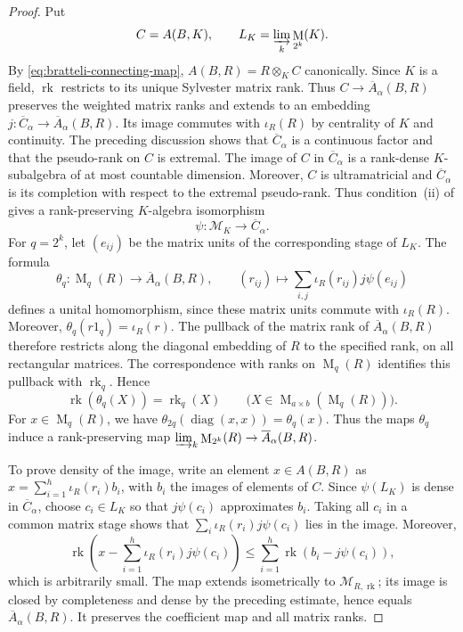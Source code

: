 \documentclass[11pt]{amsart}
\DeclareMathOperator{\rk}{rk}
\DeclareMathOperator{\Mat}{M}
\DeclareMathOperator{\diag}{diag}
\theoremstyle{definition}
\theoremstyle{remark}
\begin{document}
\begin{proof}
Put
\[
 C=A(B,K),\qquad
 L_K=\varinjlim_k\Mat_{2^k}(K).
\]
By \eqref{eq:bratteli-connecting-map},
$A(B,R)=R\otimes_K C$ canonically.
Since $K$ is a field, $\rk$ restricts to its unique Sylvester matrix rank.
Thus $C\to \overline A_\alpha(B,R)$ preserves the weighted matrix ranks and extends to an
embedding $j:\overline C_\alpha\to \overline A_\alpha(B,R)$.
Its image commutes with $\iota_R(R)$ by centrality of $K$ and continuity.
The preceding discussion shows that $\overline C_\alpha$ is a continuous
factor and that the pseudo-rank on $C$ is extremal.
The image of $C$ in $\overline C_\alpha$ is a rank-dense
$K$-subalgebra of at most countable dimension.  Moreover, $C$ is
ultramatricial and $\overline C_\alpha$ is its completion with respect
to the extremal pseudo-rank.  Thus condition~(ii) of
\cite[Theorem~2.2]{AraClaramunt2018} gives a
rank-preserving $K$-algebra isomorphism
\[
 \psi:\mathcal M_K\longrightarrow\overline C_\alpha.
\]
For $q=2^k$, let $(e_{ij})$ be the matrix units of the corresponding
stage of $L_K$.  The formula
\[
 \theta_q:\Mat_q(R)\longrightarrow \overline A_\alpha(B,R),\qquad
 (r_{ij})\longmapsto\sum_{i,j}\iota_R(r_{ij})j\psi(e_{ij})
\]
defines a unital homomorphism, since these matrix units commute with
$\iota_R(R)$.  Moreover, $\theta_q(r1_q)=\iota_R(r)$.
The pullback of the matrix rank of $\overline A_\alpha(B,R)$ therefore restricts along the
diagonal embedding of $R$ to the specified rank, on all rectangular
matrices.  The correspondence with ranks on $\Mat_q(R)$
\cite[Proposition~1.4]{JaikinLopez2020} identifies this pullback with
$\rk_q$.  Hence
\[
 \rk(\theta_q(X))=\rk_q(X)
 \qquad\bigl(X\in\Mat_{a\times b}(\Mat_q(R))\bigr).
\]
For $x\in\Mat_q(R)$, we have
$\theta_{2q}(\diag(x,x))=\theta_q(x)$.
Thus the maps $\theta_q$ induce a rank-preserving map
$\varinjlim_k\Mat_{2^k}(R)\to \overline A_\alpha(B,R)$.

To prove density of the image, write an element $x\in A(B,R)$ as
$x=\sum_{i=1}^h\iota_R(r_i)b_i$, with $b_i$ the images of elements of $C$.
Since $\psi(L_K)$ is dense in $\overline C_\alpha$, choose $c_i\in L_K$
so that $j\psi(c_i)$ approximates $b_i$.  Taking all $c_i$ in a common
matrix stage shows that $\sum_i\iota_R(r_i)j\psi(c_i)$ lies in the image.
Moreover,
\[
 \rk\left(x-\sum_{i=1}^h\iota_R(r_i)j\psi(c_i)\right)
 \leq\sum_{i=1}^h\rk(b_i-j\psi(c_i)),
\]
which is arbitrarily small.  The map extends isometrically to
$\mathcal M_{R,\rk}$; its image is closed by completeness and dense by the
preceding estimate, hence equals $\overline A_\alpha(B,R)$.  It preserves the coefficient
map and all matrix ranks.
\end{proof}
\end{document}

